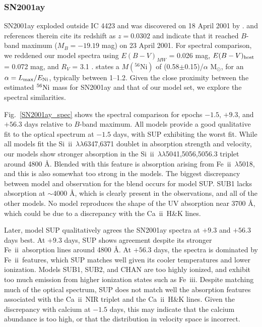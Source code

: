 \documentclass[useAMS,usenatbib,useasmath]{mnras}
\newcommand{\Msun}{\hbox{M$_\odot$}}
\newcommand{\elem}[2][default]{$^{#1}{\rm #2}$}
\newcommand{\caii}{\mbox{Ca~{\sc ii}}}
\newcommand{\skii}{\mbox{Si~{\sc ii}}}
\newcommand{\feii}{\mbox{Fe~{\sc ii}}}
\newcommand{\feiii}{\mbox{Fe~{\sc iii}}}
\newcommand{\lb}{$\lambda$}
\def\fig{Fig.}
\begin{document}
\subsubsection{SN2001ay}%
\label{SN2001ay}
SN2001ay exploded outside IC 4423 and was discovered on 18 April 2001 by \cite{SwiftLi2001}. \cite{Krisciunas2011} and references therein cite its redshift as $z=0.0302$ and indicate that it reached $B$-band maximum ($M_B=-19.19$ mag) on 23 April 2001. For spectral comparison, we reddened our model spectra using $E(B-V)_{MW}$ = 0.026 mag, $E(B-V)_{\rm host}$ = 0.072 mag, and $R_V$ = 3.1 \citep{Krisciunas2011}. \cite{Krisciunas2011} states a $M(^{56}\text{Ni})$ of (0.58$\pm$0.15)/$\alpha$ \Msun, for an $\alpha=L_{\rm max}/E_{\rm Ni}$, typically between 1--1.2. 
Given the close proximity between the estimated \elem[56]{Ni} mass for SN2001ay and that of our model set, we explore the spectral similarities. 

\fig~\ref{SN2001ay_spec} shows the spectral comparison for epochs $-1.5$, $+9.3$, and $+56.3$ days relative to $B$-band maximum. All models provide a good qualitative fit to the optical spectrum at $-1.5$ days, with SUP exhibiting the worst fit. While all models fit the \skii\ \lb\lb6347,6371 doublet in absorption strength and velocity, our models show stronger absorption in the \skii\ \lb\lb5041,5056,5056.3 triplet around 4800 \AA. Blended with this feature
is absorption arising from \feii\ \lb5018, and this is also somewhat too strong in the models. The biggest discrepancy between model and observation for the blend occurs for model SUP. SUB1 lacks absorption at $\sim$4000 \AA, which is clearly present in the observations, and all of the other models. No model reproduces the shape of the UV absorption near 3700 \AA, which could be due to a discrepancy with the \caii\ H\&K lines.  

Later, model SUP qualitatively agrees the SN2001ay spectra at $+9.3$ and $+56.3$ days best. At $+9.3$ days, SUP shows agreement despite its stronger \feii\ absorption lines around 4800 \AA. At $+56.3$ days, the spectra is dominated by \feii\ features, which SUP matches well given its cooler temperatures and lower ionization. Models SUB1, SUB2, and CHAN are too highly ionized, and exhibit too much emission from higher ionization states such as \feiii. Despite matching much of the optical spectrum, SUP does not match well the absorption features associated with the \caii\ NIR triplet and the \caii\ H\&K lines. Given the discrepancy with calcium at $-1.5$ days, this may indicate that the calcium abundance is too high, or that the distribution in velocity space is incorrect.
\end{document}
